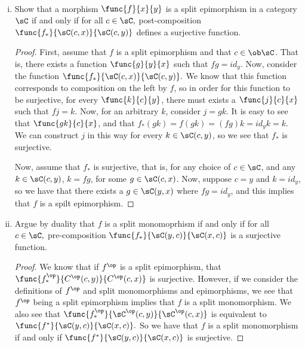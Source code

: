 \documentclass[main.tex]{subfiles}
\begin{document}
\paragraph{}
\begin{exercise}\leavevmode
	\begin{enumerate}[(i)]
	\item Show that a morphism \( \func{f}{x}{y} \) is a split epimorphism
		in a category \( \sC \) if and only if for all \( c\in \sC,\)
		post-composition \( \func{f_*}{\sC(c,x)}{\sC(c,y)} \) defines a
		surjective function.
	\begin{proof}
		 First, assume that \(f\) is a split epimorphism and that \(c \in
		 \ob\sC\). That is, there exists a function \(\func{g}{y}{x}\) such that
		 \(fg = id_y\). Now, consider the function
		 \(\func{f_*}{\sC(c,x)}{\sC(c,y)}.\) We know that this function
		 corresponds to composition on the left by \(f\), so in order for this
		 function to be surjective, for every \(\func{k}{c}{y}\), there must
		 exists a \(\func{j}{c}{x}\) such that \(fj = k\). Now, for an arbitrary
		 \(k\), consider \(j = gk\). It is easy to see that \(\func{gk}{c}{x}\),
		 and that \(f_*(gk) = f(gk) = (fg)k = id_yk = k\). We can construct
		 \(j\) in this way for every \(k \in \sC(c,y)\), so we see that \(f_*\)
		 is surjective.

		Now, assume that \(f_*\) is surjective, that is, for any choice of \(c
		\in \sC\),  and any \(k \in \sC(c,y)\), \(k = fg\), for some \(g \in
		\sC(c,x)\). Now, suppose \(c = y\) and \(k = id_y\), so we have that
		there exists a \(g \in \sC(y,x)\) where \(fg = id_y\), and this implies
		that \(f\) is a spilt epimorphism.
	\end{proof}

	\item Argue by duality that \(f\) is a split monomoprhism if and
		only if for all \(c\in\sC,\) pre-composition
		\(\func{f_*}{\sC(y,c)}{\sC(x,c)}\) is a surjective function.
	\begin{proof}
		We know that if \(f^{\op}\) is a split epimorphism, that
		\(\func{f_{*}^{\op}}{C^{\op}(c,y)}{C^{\op}(c,x)}\) is surjective.
		However, if we consider the definitions of \(f^{\op}\) and split
		monomorphisms and epimorphisms, we see that \(f^{\op}\) being a split
		epimorphism implies that \(f\) is a split monomorphism. We also see that
		\(\func{f_{*}^{\op}}{\sC^{\op}(c,y)}{\sC^{\op}(c,x)}\) is equivalent to
		\(\func{f^{*}}{\sC(y,c)}{\sC(x,c)}.\) So we have that \(f\) is a split
		monomorphism if and only if \(\func{f^{*}}{\sC(y,c)}{\sC(x,c)}\) is
		surjective.
	\end{proof}
\end{enumerate}
\end{exercise}
\end{document}

